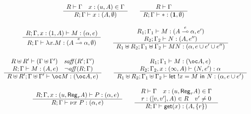 \documentclass[11pt]{article}
\newcommand{\Gives}{\vdash}             \newcommand{\IGives}{\vdash_{I}}        \newcommand{\AIGives}{\vdash_{{\it AI}}} \newcommand{\CGives}{\vdash_{C}}
\newcommand{\limpe}[1]{\stackrel{#1}{\multimap}}
\newcommand{\hyp}[3]{#1:(#2, #3)}
\newcommand{\letm}[3]{{\sf let} \ ! #1 = #2 \ {\sf in} \ #3}    \newcommand{\tertype}{{\bf 1}}
\newcommand{\csum}{\uplus}              \newcommand{\dpar}{\mid\!\mid}
\newcommand{\infer}[2]{\begin{array}{c} #1 \\ \hline #2 \end{array}}
\newcommand{\set}[1]{\{#1\}}
\newcommand{\rgtype}[2]{{\it {\sf Reg}_{#1} #2}}
\newcommand{\get}[1]{{\sf get}(#1)}
\newcommand{\new}[2]{\nu #1 \ #2}
\newcommand{\upair}[2]{[#1,#2]}
\begin{document}
\begin{table}
{\footnotesize
\[
\begin{array}{c}

\infer{R\Gives \Gamma\quad \hyp{x}{u}{A}\in \Gamma}
{R;\Gamma \Gives x:(A,\emptyset)}

\qquad

\infer{R\Gives \Gamma}
{R;\Gamma \Gives *:(\tertype,\emptyset)} \\ \\ 


\infer{R;\Gamma,\hyp{x}{1}{A} \Gives M:(\alpha,e)}
{R;\Gamma \Gives \lambda x.M:( A \limpe{e} \alpha,\emptyset)}

\qquad

\infer{\begin{array}{c}
R_1;\Gamma_1\Gives M:(A\limpe{e} \alpha,e') \\
R_2;\Gamma_2\Gives N:(A,e'')
\end{array}}
{R_1\csum R_2;\Gamma_1\csum \Gamma_2 \Gives MN:(\alpha,e\union
  e'\union e'')} \\ \\ 

\infer{
\begin{array}{c}
R\csum R'\Gives (\Gamma\csum \Gamma')\quad \w{saff}(R';\Gamma')\\
R;\Gamma \Gives M:(A,e) \quad \neg \w{aff}(R;\Gamma)
\end{array}}
{R\csum R';\Gamma \csum \Gamma' \Gives \bang M:(\bang A,e)}

\qquad

\infer{
\begin{array}{c}
R_1;\Gamma_1\Gives M:(\bang A,e)\\
R_2;\Gamma_2,\hyp{x}{\infty}{A} \Gives (N,e'):\alpha
\end{array}}
{R_1\csum R_2;\Gamma_1\csum \Gamma_2 \Gives
  \letm{x}{M}{N}:(\alpha,e\union e')} \\ \\ 


\infer{R;\Gamma,\hyp{x}{u}{\rgtype{r}{A}} \Gives P:(\alpha,e)}
{R;\Gamma \Gives \new{x}{P}:(\alpha,e)}

\qquad
\infer{\begin{array}{c}
R\Gives \Gamma \quad \hyp{x}{u}{\rgtype{r}{A}}\in \Gamma  \\
\hyp{r}{\upair{v}{v'}}{A} \in R \quad v' \neq 0
\end{array}}
{R;\Gamma \Gives \get{x}:(A,\set{r})} \\ \\


\end{array}\]}
\end{table}
\end{document}
